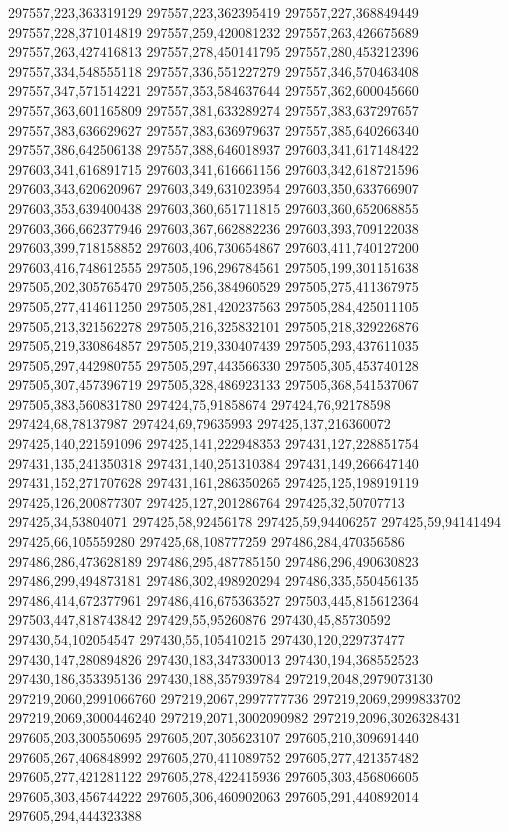 297557,223,363319129
297557,223,362395419
297557,227,368849449
297557,228,371014819
297557,259,420081232
297557,263,426675689
297557,263,427416813
297557,278,450141795
297557,280,453212396
297557,334,548555118
297557,336,551227279
297557,346,570463408
297557,347,571514221
297557,353,584637644
297557,362,600045660
297557,363,601165809
297557,381,633289274
297557,383,637297657
297557,383,636629627
297557,383,636979637
297557,385,640266340
297557,386,642506138
297557,388,646018937
297603,341,617148422
297603,341,616891715
297603,341,616661156
297603,342,618721596
297603,343,620620967
297603,349,631023954
297603,350,633766907
297603,353,639400438
297603,360,651711815
297603,360,652068855
297603,366,662377946
297603,367,662882236
297603,393,709122038
297603,399,718158852
297603,406,730654867
297603,411,740127200
297603,416,748612555
297505,196,296784561
297505,199,301151638
297505,202,305765470
297505,256,384960529
297505,275,411367975
297505,277,414611250
297505,281,420237563
297505,284,425011105
297505,213,321562278
297505,216,325832101
297505,218,329226876
297505,219,330864857
297505,219,330407439
297505,293,437611035
297505,297,442980755
297505,297,443566330
297505,305,453740128
297505,307,457396719
297505,328,486923133
297505,368,541537067
297505,383,560831780
297424,75,91858674
297424,76,92178598
297424,68,78137987
297424,69,79635993
297425,137,216360072
297425,140,221591096
297425,141,222948353
297431,127,228851754
297431,135,241350318
297431,140,251310384
297431,149,266647140
297431,152,271707628
297431,161,286350265
297425,125,198919119
297425,126,200877307
297425,127,201286764
297425,32,50707713
297425,34,53804071
297425,58,92456178
297425,59,94406257
297425,59,94141494
297425,66,105559280
297425,68,108777259
297486,284,470356586
297486,286,473628189
297486,295,487785150
297486,296,490630823
297486,299,494873181
297486,302,498920294
297486,335,550456135
297486,414,672377961
297486,416,675363527
297503,445,815612364
297503,447,818743842
297429,55,95260876
297430,45,85730592
297430,54,102054547
297430,55,105410215
297430,120,229737477
297430,147,280894826
297430,183,347330013
297430,194,368552523
297430,186,353395136
297430,188,357939784
297219,2048,2979073130
297219,2060,2991066760
297219,2067,2997777736
297219,2069,2999833702
297219,2069,3000446240
297219,2071,3002090982
297219,2096,3026328431
297605,203,300550695
297605,207,305623107
297605,210,309691440
297605,267,406848992
297605,270,411089752
297605,277,421357482
297605,277,421281122
297605,278,422415936
297605,303,456806605
297605,303,456744222
297605,306,460902063
297605,291,440892014
297605,294,444323388

